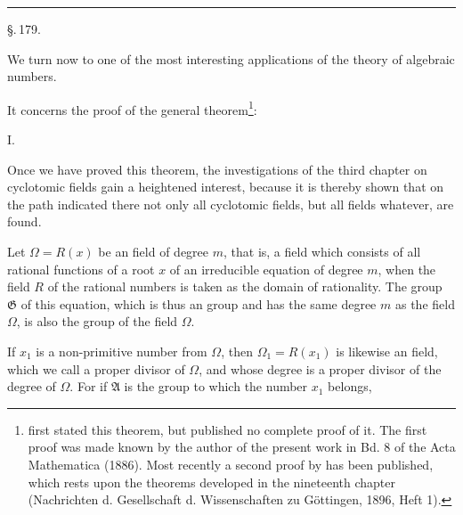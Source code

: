 
\begin{center}


\rule{3cm}{0.4pt}

\S.\,179.

\end{center}

We turn now to one of the most interesting applications of the theory of algebraic numbers.

\begingroup
\renewcommand{\thefootnote}{\arabic{footnote})}
It concerns the proof of the general theorem\footnote{ first stated this theorem, but published no complete proof of it. The first proof was made known by the author of the present work in Bd. 8 of the Acta Mathematica (1886). Most recently a second proof by  has been published, which rests upon the theorems developed in the nineteenth chapter (Nachrichten d. Gesellschaft d. Wissenschaften zu Göttingen, 1896, Heft 1).}:
\endgroup

I. 

Once we have proved this theorem, the investigations of the third chapter on cyclotomic fields gain a heightened interest, because it is thereby shown that on the path indicated there not only all cyclotomic fields, but all  fields whatever, are found.

Let $\Omega = R(x)$ be an  field of degree $m$, that is, a field which consists of all rational functions of a root $x$ of an irreducible  equation of degree $m$, when the field $R$ of the rational numbers is taken as the domain of rationality. The  group $\mathfrak{G}$ of this equation, which is thus an  group and has the same degree $m$ as the field $\Omega$, is also the group of the field $\Omega$.

If $x_1$ is a non-primitive number from $\Omega$, then $\Omega_1 = R(x_1)$ is likewise an  field, which we call a proper divisor of $\Omega$, and whose degree is a proper divisor of the degree of $\Omega$. For if $\mathfrak{A}$ is the group to which the number $x_1$ belongs,
